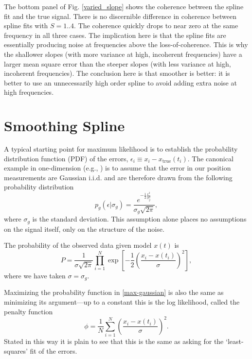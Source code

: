 \documentclass{ametsoc}
\begin{document}
The bottom panel of Fig. \ref{varied_slope} shows the coherence between the spline fit and the true signal. There is no discernible difference in coherence between spline fits with $S=1..4$. The coherence quickly drops to near zero at the same frequency in all three cases. The implication here is that the spline fits are essentially producing noise at frequencies above the loss-of-coherence. This is why the shallower slopes (with more variance at high, incoherent frequencies) have a larger mean square error than the steeper slopes (with less variance at high, incoherent frequencies). The conclusion here is that smoother is better: it is better to use an unnecessarily high order spline to avoid adding extra noise at high frequencies.

%
\section{Smoothing Spline}
\label{sec:smoothing_spline}
%

A typical starting point for maximum likelihood is to establish the probability distribution function (PDF) of the errors, $\epsilon_i \equiv x_i - x_{\textrm{true}}(t_i)$. The canonical example in one-dimension (e.g., \citet{press1992-book}) is to assume that the error in our position measurements are Gaussian i.i.d. and are therefore drawn from the following probability distribution
\begin{equation}
\label{gaussian_pdf}
p_g(\epsilon|\sigma_g) = \frac{e^{-\frac{1}{2}\frac{\epsilon^2}{\sigma_g^2}} }{\sigma_g \sqrt{ 2 \pi}},
\end{equation}
where $\sigma_g$ is the standard deviation. This assumption alone places no assumptions on the signal itself, only on the structure of the noise.

The probability of the observed data given model $x(t)$ is
\begin{equation}
\label{max-gaussian}
P = \frac{1}{\sigma \sqrt{2 \pi}} \prod_{i=1}^{N}  \exp \left[ -\frac{1}{2} \left( \frac{x_i - x(t_i)}{\sigma} \right)^2 \right],
\end{equation}
where we have taken $\sigma=\sigma_g$.

Maximizing the probability function in \eqref{max-gaussian} is also the same as minimizing its argument---up to a constant this is the log likelihood, called the penalty function
\begin{equation}
\label{least-squares}
\phi = \frac{1}{N}\sum_{i=1}^{N} \left( \frac{x_i - x(t_i)}{\sigma} \right)^2 .
\end{equation}
Stated in this way it is plain to see that this is the same as asking for the `least-squares' fit of the errors.
\end{document}
